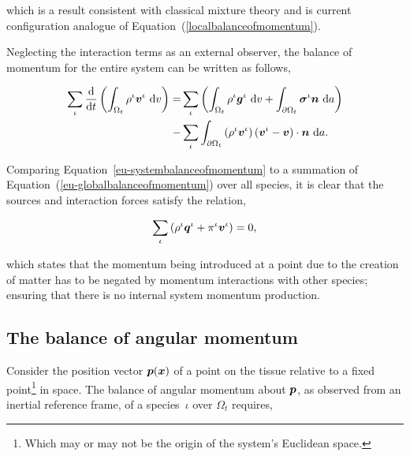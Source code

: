 \noindent which is a result consistent with classical mixture
theory \citep{TruesdellToupin:60} and is current configuration
analogue of Equation~(\ref{localbalanceofmomentum}). 

Neglecting the interaction terms as an external observer, the balance
of momentum for the entire system can be written as follows,

\begin{equation}
\begin{split}
\sum\limits_{\iota}
\frac{\mathrm{d}}{\mathrm{d}t}\left(\int_{\Omega_{t}} \rho^{\iota}
\mbox{\boldmath$ v$}^{\iota} \ \mathrm{d}v \right) = & \sum\limits_{\iota}
\left(\int_{\Omega_{t}} \rho^{\iota} \mbox{\boldmath$ g$}^{\iota} \ \mathrm{d}v +
\int_{\partial \Omega_{t}}
\mbox{\boldmath$\sigma$}^{\iota}\mbox{\boldmath$ n$}\ \mathrm{d}a\right)\\ -
&\sum\limits_{\iota}\int_{\partial \Omega_{t}} \left(\rho^{\iota}
\mbox{\boldmath$ v$}^{\iota} \right) \left(\mbox{\boldmath$ v$}^{\iota} - \mbox{\boldmath$ v$}\right) \cdot
\mbox{\boldmath$ n$}\ \mathrm{d}a.
\end{split}
\label{eu-systembalanceofmomentum}
\end{equation}

\noindent Comparing Equation~\ref{eu-systembalanceofmomentum} to a
summation of Equation~(\ref{eu-globalbalanceofmomentum}) over all
species, it is clear that the sources and interaction forces satisfy
the relation,

\begin{equation}
\sum\limits_{\iota}\left( \rho^{\iota}\mbox{\boldmath$ q$}^{\iota} + \pi^{\iota}
\mbox{\boldmath$ v$}^{\iota} \right) = 0,
\label{eu-summationrelationmomentum}
\end{equation}

\noindent which states that the momentum being introduced at a point
due to the creation of matter has to be negated by momentum
interactions with other species; ensuring that there is no internal
system momentum production.

\subsection{The balance of angular momentum}
\label{eu-balance-of-angular-momentum}

Consider the position vector $\mbox{\boldmath$ p$}(\mbox{\boldmath$ x$})$ of a point on the tissue
relative to a fixed point\footnote{Which may or may not be the origin
  of the system's Euclidean space.} in space. The balance of angular
momentum about $\mbox{\boldmath$ p$}$, as observed from an inertial reference frame, of
a species~$\iota$ over $\Omega_{t}$ requires,

